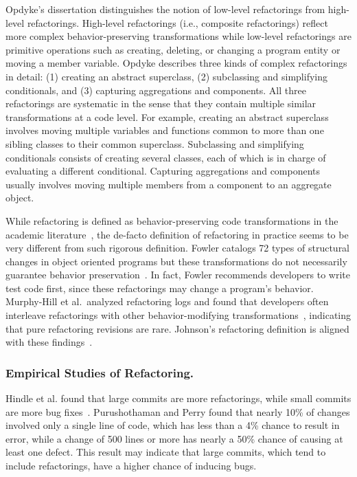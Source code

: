 Opdyke's dissertation \cite{Opdyke1992:ROF} distinguishes the notion of low-level refactorings from high-level refactorings. High-level refactorings (i.e., composite refactorings) reflect more complex behavior-preserving transformations while low-level refactorings are primitive operations such as creating, deleting, or changing a program entity or moving a member variable. Opdyke describes three kinds of complex refactorings in detail: (1) creating an abstract superclass, (2) subclassing and simplifying conditionals, and (3) capturing aggregations and components. All three refactorings are systematic in the sense that they contain multiple similar transformations at a code level. For example, {creating an abstract superclass} involves moving multiple variables and functions common to more than one sibling classes to their common superclass.  {Subclassing and simplifying conditionals} consists of creating  several classes, each of which is in charge of evaluating a different conditional. Capturing aggregations and components usually involves moving {multiple} members from a component to an aggregate object. 

While refactoring is defined as behavior-preserving code transformations in the academic literature~\cite{Mens2004:SSR}, the de-facto definition of refactoring in practice seems to be very different from such rigorous definition. Fowler catalogs 72 types of structural changes in object oriented programs but these transformations do not necessarily guarantee behavior preservation~\cite{1999:RID}. In fact, Fowler recommends developers to write test code first, since these refactorings may change a program's behavior. Murphy-Hill et al.~analyzed refactoring logs and found that developers often interleave refactorings with other behavior-modifying transformations~\cite{Murphy-Hill2012:refactor}, indicating that pure refactoring revisions are rare. Johnson's refactoring definition is aligned with these findings~\cite{Johnson2011}.

\subsubsection{Empirical Studies of Refactoring.} 
\label{sec:refactoringstudies} 

Hindle et al. found that large commits are more refactorings, while small commits are more bug fixes~\cite{Hindle2008:largecommit}. Purushothaman and Perry found that nearly 10\% of changes involved only a single line of code, which has less than a 4\% chance to result in error, while a change of 500 lines or more has nearly a 50\% chance of causing at least one defect. This result may indicate that large commits, which tend to include refactorings, have a higher chance of inducing bugs. 

